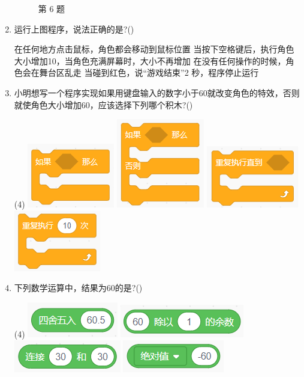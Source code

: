 \documentclass[10pt, a4paper]{article}
\begin{document}
\begin{enumerate}
\begin{figure}[htbp]
\begin{minipage}[t]{.24\textwidth}
                \caption*{第 6 题}
            \end{minipage}
        \end{figure}

        \item 运行上图程序，说法正确的是?(\qquad)
        \begin{tasks}
            \task 在任何地方点击鼠标，角色都会移动到鼠标位置
            \task 当按下空格键后，执行角色大小增加10，当角色充满屏幕时，大小不再增加
            \task 在没有任何操作的时候，角色会在舞台区乱走
            \task 当碰到红色，说“游戏结束”2 秒，程序停止运行
        \end{tasks}

        \item 小明想写一个程序实现如果用键盘输入的数字小于60就改变角色的特效，否则就使角色大小增加60，应该选择下列哪个积木?(\qquad)
        \begin{tasks}(4)
            \task \includegraphics[width=.15\textwidth]{4a.png}
            \task \includegraphics[width=.11\textwidth]{4b.png}
            \task \includegraphics[width=.15\textwidth]{4c.png}
            \task \includegraphics[width=.15\textwidth]{4d.png}
        \end{tasks}

        \item 下列数学运算中，结果为60的是?(\qquad)
        \begin{tasks}(4)
            \task \includegraphics[width=.12\textwidth]{5a.png}
            \task \includegraphics[width=.17\textwidth]{5b.png}
            \task \includegraphics[width=.15\textwidth]{5c.png}
            \task \includegraphics[width=.15\textwidth]{5d.png}
        \end{tasks}


\end{enumerate}
\end{document}

